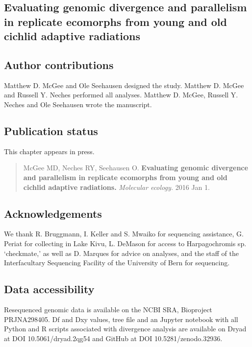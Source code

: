 \begin{refsection}

\chapter{Evaluating genomic divergence and parallelism in replicate ecomorphs from young and old cichlid adaptive radiations}


\section{Author contributions}

Matthew D. McGee and Ole Seehausen designed the study. Matthew D. McGee and Russell Y. Neches performed all analyses. Matthew D. McGee, Russell Y. Neches and Ole Seehausen wrote the manuscript.

\section{Publication status}

This chapter appears in press.

\begin{quote}
McGee MD, Neches RY, Seehausen O. {\bf Evaluating genomic divergence and parallelism in replicate ecomorphs from young and old cichlid adaptive radiations.} {\em Molecular ecology.} 2016 Jan 1.
\end{quote}







\section{Acknowledgements}

We thank R. Bruggmann, I. Keller and S. Mwaiko for sequencing assistance, G. Periat for collecting in Lake Kivu, L. DeMason for access to Harpagochromis sp. `checkmate,' as well as D. Marques for advice on analyses, and the staff of the Interfacultary Sequencing Facility of the University of Bern for sequencing.

\section{Data accessibility}

Resequenced genomic data is available on the NCBI SRA, Bioproject PRJNA298405. Df and Dxy values, tree file and an Jupyter notebook with all Python and R scripts associated with divergence analysis are available on Dryad at DOI 10.5061/dryad.2qg54 and GitHub at DOI 10.5281/zenodo.32936.

\printbibliography[heading=subbibliography]

\end{refsection}
